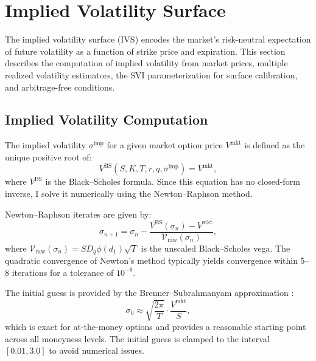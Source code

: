 \documentclass[11pt,a4paper]{article}
\newcommand{\bs}{\text{BS}}
\begin{document}
\section{Implied Volatility Surface}\label{sec:vol_surface}

The implied volatility surface (IVS) encodes the market's risk-neutral expectation of future volatility as a function of strike price and expiration. This section describes the computation of implied volatility from market prices, multiple realized volatility estimators, the SVI parameterization for surface calibration, and arbitrage-free conditions.

\subsection{Implied Volatility Computation}\label{subsec:iv_computation}

The implied volatility $\sigma^{\text{imp}}$ for a given market option price $V^{\text{mkt}}$ is defined as the unique positive root of:
\begin{equation}\label{eq:iv_definition}
    V^{\bs}(S, K, T, r, q, \sigma^{\text{imp}}) = V^{\text{mkt}},
\end{equation}
where $V^{\bs}$ is the Black--Scholes formula. Since this equation has no closed-form inverse, I solve it numerically using the Newton--Raphson method.

Newton--Raphson iterates are given by:
\begin{equation}\label{eq:newton_raphson}
    \sigma_{n+1} = \sigma_n - \frac{V^{\bs}(\sigma_n) - V^{\text{mkt}}}{\mathcal{V}_{\text{raw}}(\sigma_n)},
\end{equation}
where $\mathcal{V}_{\text{raw}}(\sigma_n) = S D_q \phi(d_1) \sqrt{T}$ is the unscaled Black--Scholes vega. The quadratic convergence of Newton's method typically yields convergence within 5--8 iterations for a tolerance of $10^{-8}$.

The initial guess is provided by the Brenner--Subrahmanyam approximation \citep{brenner1988short}:
\begin{equation}\label{eq:brenner_subrahmanyam}
    \sigma_0 \approx \sqrt{\frac{2\pi}{T}} \cdot \frac{V^{\text{mkt}}}{S},
\end{equation}
which is exact for at-the-money options and provides a reasonable starting point across all moneyness levels. The initial guess is clamped to the interval $[0.01, 3.0]$ to avoid numerical issues.
\end{document}
